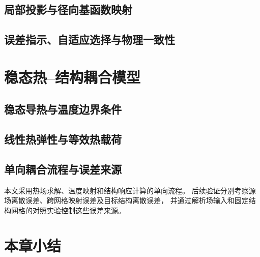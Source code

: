 \subsection{局部投影与径向基函数映射}
\thesisdraftnote

\subsection{误差指示、自适应选择与物理一致性}
\thesisdraftnote

\section{稳态热--结构耦合模型}
\subsection{稳态导热与温度边界条件}
\thesisdraftnote

\subsection{线性热弹性与等效热载荷}
\thesisdraftnote

\subsection{单向耦合流程与误差来源}
本文采用热场求解、温度映射和结构响应计算的单向流程。
后续验证分别考察源场离散误差、跨网格映射误差及目标结构离散误差，
并通过解析场输入和固定结构网格的对照实验控制这些误差来源。

\section{本章小结}
\thesisdraftnote


